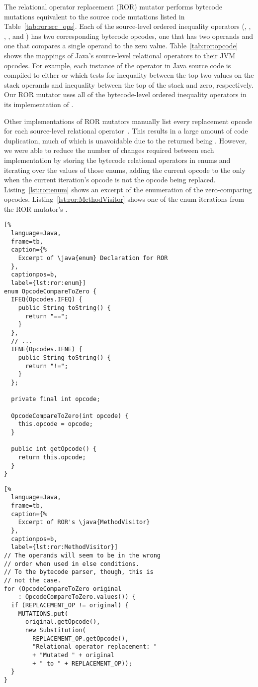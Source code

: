 The relational operator replacement (ROR) mutator performs bytecode mutations equivalent to the source code mutations listed in Table~\ref{tab:ror:src_ops}.
Each of the source-level ordered inequality operators (\java{>}, \java{>=}, \java{==}, \java{<=}, and \java{<}) has two corresponding bytecode opcodes, one that has two operands and one that compares a single operand to the zero value.
Table~\ref{tab:ror:opcode} shows the mappings of Java's source-level relational operators to their JVM opcodes.
For example, each instance of the \java{!=} operator in Java source code is compiled to either  or  which tests for inequality between the top two values on the stack operands and inequality between the top of the stack and zero, respectively.
Our ROR mutator uses all of the bytecode-level ordered inequality operators in its implementation of .

Other implementations of ROR mutators manually list every replacement opcode for each source-level relational operator~\cite{ProdigyXable}.
This results in a large amount of code duplication, much of which is unavoidable due to the  returned being .
However, we were able to reduce the number of changes required between each implementation by storing the bytecode relational operators in enums and iterating over the values of those enums, adding the current opcode to the  only when the current iteration's opcode is not the opcode being replaced.
Listing~\ref{lst:ror:enum} shows an excerpt of the enumeration of the zero-comparing opcodes.
Listing~\ref{lst:ror:MethodVisitor} shows one of the enum iterations from the ROR mutator's .

\begin{lstlisting}[%
  language=Java,
  frame=tb,
  caption={%
    Excerpt of \java{enum} Declaration for ROR
  },
  captionpos=b,
  label={lst:ror:enum}]
enum OpcodeCompareToZero {
  IFEQ(Opcodes.IFEQ) {
    public String toString() {
      return "==";
    }
  },
  // ...
  IFNE(Opcodes.IFNE) {
    public String toString() {
      return "!=";
    }
  };

  private final int opcode;

  OpcodeCompareToZero(int opcode) {
    this.opcode = opcode;
  }

  public int getOpcode() {
    return this.opcode;
  }
}
\end{lstlisting}

\begin{lstlisting}[%
  language=Java,
  frame=tb,
  caption={%
    Excerpt of ROR's \java{MethodVisitor}
  },
  captionpos=b,
  label={lst:ror:MethodVisitor}]
// The operands will seem to be in the wrong
// order when used in else conditions.
// To the bytecode parser, though, this is
// not the case.
for (OpcodeCompareToZero original
    : OpcodeCompareToZero.values()) {
  if (REPLACEMENT_OP != original) {
    MUTATIONS.put(
      original.getOpcode(),
      new Substitution(
        REPLACEMENT_OP.getOpcode(),
        "Relational operator replacement: "
        + "Mutated " + original
        + " to " + REPLACEMENT_OP));
  }
}
\end{lstlisting}
